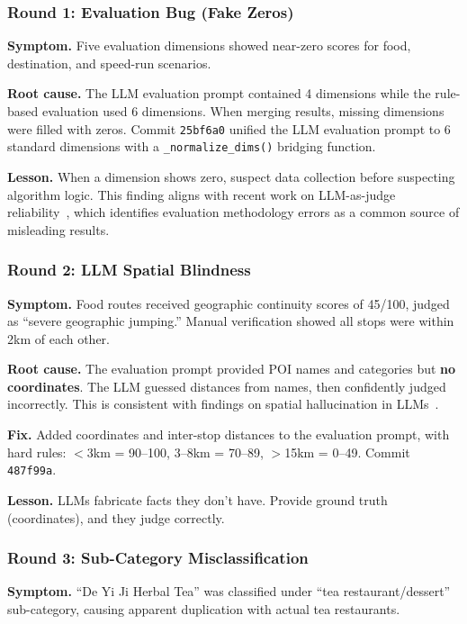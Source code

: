 \subsubsection{Round 1: Evaluation Bug (Fake Zeros)}

\textbf{Symptom.} Five evaluation dimensions showed near-zero scores for food, destination, and speed-run scenarios.

\textbf{Root cause.} The LLM evaluation prompt contained 4 dimensions while the rule-based evaluation used 6 dimensions. When merging results, missing dimensions were filled with zeros. Commit \texttt{25bf6a0} unified the LLM evaluation prompt to 6 standard dimensions with a \texttt{\_normalize\_dims()} bridging function.

\textbf{Lesson.} When a dimension shows zero, suspect data collection before suspecting algorithm logic. This finding aligns with recent work on LLM-as-judge reliability~\cite{gu2024llmjudge}, which identifies evaluation methodology errors as a common source of misleading results.

\subsubsection{Round 2: LLM Spatial Blindness}

\textbf{Symptom.} Food routes received geographic continuity scores of 45/100, judged as ``severe geographic jumping.'' Manual verification showed all stops were within 2km of each other.

\textbf{Root cause.} The evaluation prompt provided POI names and categories but \textbf{no coordinates}. The LLM guessed distances from names, then confidently judged incorrectly. This is consistent with findings on spatial hallucination in LLMs~\cite{gong2024spatial}.

\textbf{Fix.} Added coordinates and inter-stop distances to the evaluation prompt, with hard rules: $<$3km = 90--100, 3--8km = 70--89, $>$15km = 0--49. Commit \texttt{487f99a}.

\textbf{Lesson.} LLMs fabricate facts they don't have. Provide ground truth (coordinates), and they judge correctly.

\subsubsection{Round 3: Sub-Category Misclassification}

\textbf{Symptom.} ``De Yi Ji Herbal Tea'' was classified under ``tea restaurant/dessert'' sub-category, causing apparent duplication with actual tea restaurants.

